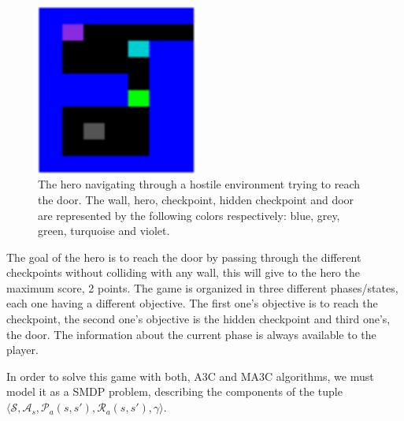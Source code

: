 \begin{figure}[hbtp]
\begin{center}
\includegraphics[width=200]{img/SimpleStates_going_up.png}
\end{center}
\caption[Simple States game]
{The hero navigating through a hostile environment trying to reach the door. The wall, hero, checkpoint, hidden checkpoint
and door are represented by the following colors respectively: blue, grey, green, turquoise and violet.}
\label{fig:SimpleStates}
\end{figure}

The goal of the hero is to reach the door by passing through the different checkpoints without colliding
with any wall, this will give to the hero the maximum score, 2 points.
The game is organized in three different phases/states, each one having a different objective.
The first one's objective is to reach the checkpoint,
the second one's objective is the hidden checkpoint and third one's, the door.
The information about the current phase is always available to the player.

In order to solve this game with both, \ac{A3C} and \ac{MA3C} algorithms, we must model it as a \ac{SMDP} problem,
describing the components of the tuple $\langle\mathcal{S}, \mathcal{A}_s, \mathcal{P}_a(s,s'), \mathcal{R}_a(s,s'), \gamma \rangle$.

